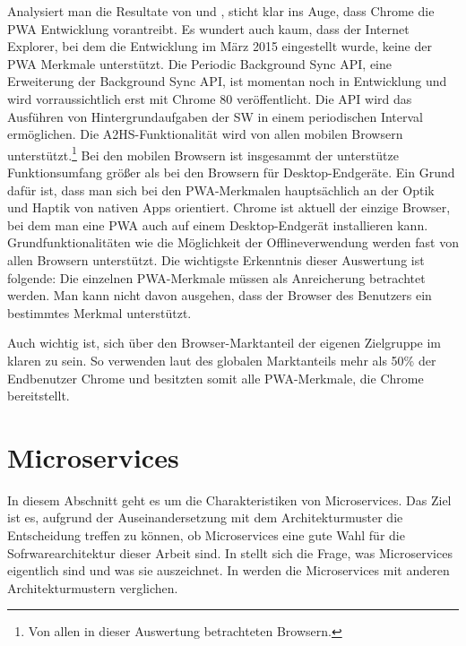Analysiert man die Resultate von  und
, sticht klar ins Auge, dass Chrome
die PWA Entwicklung vorantreibt. Es wundert auch kaum, dass der Internet Explorer,
bei dem die Entwicklung im März 2015 eingestellt wurde,\cite{HeiseInternetExplorer} keine der PWA Merkmale
unterstützt. Die Periodic Background Sync API, eine Erweiterung der Background
Sync API, ist momentan noch in Entwicklung und wird vorraussichtlich erst mit
Chrome 80 veröffentlicht. Die API wird das Ausführen von Hintergrundaufgaben der SW
in einem periodischen Interval ermöglichen.\cite{ChromeStatusPeriodicBackgroundSync}
Die A2HS-Funktionalität wird von allen mobilen Browsern unterstützt.\footnote{Von allen in dieser Auswertung betrachteten Browsern.}
Bei den mobilen Browsern ist insgesammt der unterstütze Funktionsumfang größer als
bei den Browsern für Desktop-Endgeräte. Ein Grund dafür ist, dass man sich bei den PWA-Merkmalen
hauptsächlich an der Optik und Haptik von nativen Apps orientiert. Chrome ist aktuell
der einzige Browser, bei dem man eine PWA auch auf einem Desktop-Endgerät installieren
kann. Grundfunktionalitäten wie  die Möglichkeit der Offlineverwendung werden fast von allen
Browsern unterstützt. Die wichtigste Erkenntnis dieser Auswertung ist folgende: Die einzelnen
PWA-Merkmale müssen als Anreicherung betrachtet werden. Man kann nicht davon ausgehen, dass
der Browser des Benutzers ein bestimmtes Merkmal unterstützt.

Auch wichtig ist, sich über den Browser-Marktanteil der eigenen Zielgruppe im klaren zu sein.
So verwenden laut des globalen Marktanteils mehr als 50\% der Endbenutzer Chrome und besitzten somit
alle PWA-Merkmale, die Chrome bereitstellt.\cite{StatCounterBrowserMarketShare}

\section{Microservices}
\label{sec:microservices}
In diesem Abschnitt geht es um die Charakteristiken von Microservices. Das Ziel ist es,
aufgrund der Auseinandersetzung mit dem Architekturmuster die Entscheidung treffen zu können, ob Microservices
eine gute Wahl für die Sofrwarearchitektur dieser Arbeit sind. In 
stellt sich die Frage, was Microservices eigentlich sind und was sie auszeichnet. In
 werden die
Microservices mit anderen Architekturmustern verglichen.

